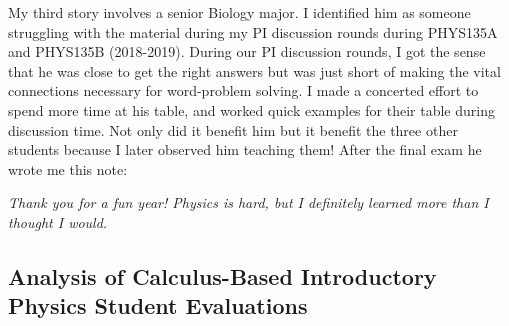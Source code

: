 \documentclass[../../main.tex]{subfiles}
\begin{document}
My third story involves a senior Biology major.  I identified him as someone struggling with the material during my PI discussion rounds during PHYS135A and PHYS135B (2018-2019).  During our PI discussion rounds, I got the sense that he was close to get the right answers but was just short of making the vital connections necessary for word-problem solving.  I made a concerted effort to spend more time at his table, and worked quick examples for their table during discussion time.  Not only did it benefit him but it benefit the three other students because I later observed him teaching them!  After the final exam he wrote me this note: \\ \hspace{0.1cm}

\textit{Thank you for a fun year!  Physics is hard, but I definitely learned more than I thought I would.} \\ \hspace{0.1cm}

\subsection{Analysis of Calculus-Based Introductory Physics Student Evaluations}
\end{document}
